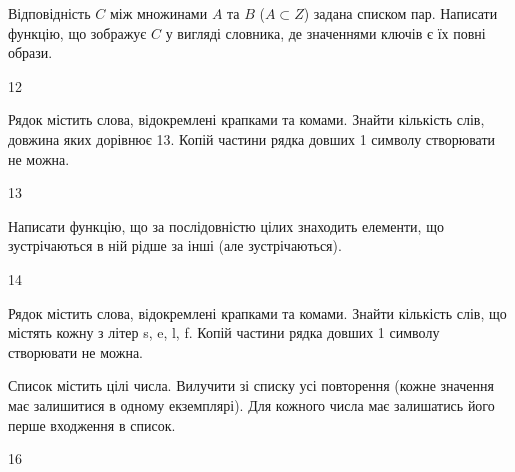 Відповідність $C$ між множинами $A$ та $B$ ($A\subset Z$) задана списком пар. Написати функцію, що зображує $C$ у вигляді словника, де значеннями ключів є їх повні образи.
\\\par
12 














Рядок містить слова, відокремлені крапками та комами. Знайти кількість слів, довжина яких дорівнює 13. Копій частини рядка довших 1 символу створювати не можна.
\\\par
13 














Написати функцію, що за послідовністю цілих знаходить елементи, що зустрічаються в ній рідше за інші (але зустрічаються).
\\\par
14 














Рядок містить слова, відокремлені крапками та комами. Знайти кількість слів, що містять кожну з літер s, e, l, f. Копій частини рядка довших 1 символу створювати не можна.
\\\par
{} 














Список містить цілі числа. Вилучити зі списку усі повторення (кожне значення має залишитися в одному екземплярі). Для кожного числа має залишатись його перше входження в список.
\\\par
16 














